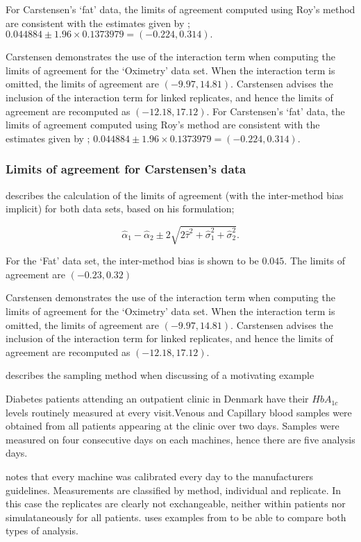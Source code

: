 \documentclass[12pt, a4paper]{report}
\theoremstyle{plain}
\theoremstyle{definition}
\theoremstyle{remark}
\begin{document}
	
	
	For Carstensen's `fat' data, the limits of agreement computed using Roy's
	method are consistent with the estimates given by \citet{BXC2008}; $0.044884  \pm 1.96 \times  0.1373979 = (-0.224,  0.314).$
	
	
	Carstensen demonstrates the use of the interaction term when computing the limits of agreement for the `Oximetry' data set. When the interaction term is omitted, the limits of agreement are $(-9.97, 14.81)$. Carstensen advises the inclusion of the interaction term for linked replicates, and hence the limits of agreement are recomputed as $(-12.18,17.12)$.
	\newpage
	For Carstensen's `fat' data, the limits of agreement computed using Roy's
	method are consistent with the estimates given by \citet{BXC2008}; $0.044884  \pm 1.96 \times  0.1373979 = (-0.224,  0.314).$
	
	\subsubsection{Limits of agreement for Carstensen's data}
	
	
	\citet{bxc2008} describes the calculation of the limits of agreement (with the inter-method bias implicit) for both data sets, based on his formulation;
	
	\[\hat{\alpha}_1 - \hat{\alpha}_2 \pm 2\sqrt{2\hat{\tau}^2 +\hat{\sigma}_1^2 +\hat{\sigma}_2^2 }.\]
	
	For the `Fat' data set, the inter-method bias is shown to be $0.045$. The limits of agreement are $(-0.23 , 0.32)$
	
	Carstensen demonstrates the use of the interaction term when computing the limits of agreement for the `Oximetry' data set. When the interaction term is omitted, the limits of agreement are $(-9.97, 14.81)$. Carstensen advises the inclusion of the interaction term for linked replicates, and hence the limits of agreement are recomputed as $(-12.18,17.12)$.
	
	\newpage
	\citet{bxc2008} describes the sampling method when discussing of a motivating example
	
	Diabetes patients attending an outpatient clinic in Denmark have their $HbA_{1c}$ levels routinely measured at every visit.Venous and Capillary blood samples were obtained from all patients appearing at the clinic over two days.
	Samples were measured on four consecutive days on each machines, hence there are five analysis days.
	
	\citet{bxc2008} notes that every machine was calibrated every day to  the manufacturers guidelines.
	Measurements are classified by method, individual and replicate. In this case the replicates are clearly not exchangeable, neither within patients nor simulataneously for all patients.
	\citet{ARoy2009} uses examples from \citet{BA86} to be able to
	compare both types of analysis.
	
\end{document}
